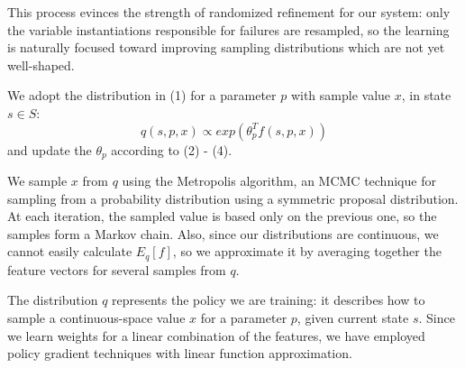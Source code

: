 This process evinces the strength of randomized refinement for our system: only the variable
instantiations responsible for failures are resampled, so the learning is naturally
focused toward improving sampling distributions which are not yet well-shaped.

We adopt the distribution in (1) for a parameter $p$ with sample value $x$,
in state $s \in S$:
\begin{equation}
q(s, p, x) \propto exp(\theta_{p}^{T} f(s, p, x))
\end{equation}
and update the $\theta_{p}$ according to (2) - (4).

We sample $x$ from $q$ using the Metropolis algorithm,
an MCMC technique for sampling from a probability distribution using
a symmetric proposal distribution. At each iteration, the sampled value
is based only on the previous one, so the samples form a Markov chain.
Also, since our distributions are continuous, we cannot easily calculate $E_{q}[f]$,
so we approximate it by averaging together the feature vectors for several samples from $q$.

The distribution $q$ represents the policy we are training: it describes how to
sample a continuous-space value $x$ for a parameter $p$, given current state $s$.
Since we learn weights for a linear combination of the features, we have employed
policy gradient techniques with linear function approximation.